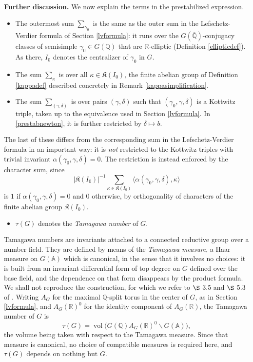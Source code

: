 \documentclass[11pt,a4paper]{article}
\theoremstyle{definition}
\theoremstyle{plain}
\theoremstyle{remark}
\theoremstyle{plain}
\DeclareMathOperator{\vol}{vol}
\begin{document}
\textbf{Further discussion.}
We now explain the terms in the prestabilized expression.

\begin{itemize}
    \item The outermost sum $\sum_{\gamma_0}$ is the same as the outer sum in the Lefschetz-Verdier formula of Section \ref{lvformula}: it runs over the $G(\overline{\mathbb{Q}})$-conjugacy classes of semisimple $\gamma_0 \in G(\mathbb{Q})$ that are $\mathbb{R}$-elliptic (Definition \ref{ellipticdef}). As there, $I_0$ denotes the centralizer of $\gamma_0$ in $G$.
    \item The sum $\sum_{\kappa}$ is over all $\kappa \in \mathfrak{K}(I_0)$, the finite abelian group of Definition \ref{kappadef} described concretely in Remark \ref{kappasimplification}.
    \item The sum $\sum_{(\gamma, \delta)}$ is over pairs $(\gamma, \delta)$ such that $(\gamma_0, \gamma, \delta)$ is a Kottwitz triple, taken up to the equivalence used in Section \ref{lvformula}. In \eqref{prestabnewton}, it is further restricted by $\delta \mapsto b$.
\end{itemize}

The last of these differs from the corresponding sum in the Lefschetz-Verdier formula in an important way: it is \emph{not} restricted to the Kottwitz triples with trivial invariant $\alpha(\gamma_0, \gamma, \delta) = 0$. The restriction is instead enforced by the character sum, since
$$\lvert \mathfrak{K}(I_0) \rvert^{-1} \sum_{\kappa \in \mathfrak{K}(I_0)} \langle \alpha(\gamma_0, \gamma, \delta), \kappa \rangle$$
is $1$ if $\alpha(\gamma_0, \gamma, \delta) = 0$ and $0$ otherwise, by orthogonality of characters of the finite abelian group $\mathfrak{K}(I_0)$.

\begin{itemize}
    \item $\tau(G)$ denotes the \textit{Tamagawa number} of $G$.
\end{itemize}

Tamagawa numbers are invariants attached to a connected reductive group over a number field. They are defined by means of the \textit{Tamagawa measure}, a Haar measure on $G(\mathbb{A})$ which is canonical, in the sense that it involves no choices: it is built from an invariant differential form of top degree on $G$ defined over the base field, and the dependence on that form disappears by the product formula. We shall not reproduce the construction, for which we refer to $\S$ 3.5 and $\S$ 5.3 of \cite{MR4615820}. Writing $A_G$ for the maximal $\mathbb{Q}$-split torus in the center of $G$, as in Section \ref{lvformula}, and $A_G(\mathbb{R})^0$ for the identity component of $A_G(\mathbb{R})$, the Tamagawa number of $G$ is
$$\tau(G) = \vol \bigl(G(\mathbb{Q})A_G(\mathbb{R})^0 \backslash G(\mathbb{A})\bigr),$$
the volume being taken with respect to the Tamagawa measure. Since that measure is canonical, no choice of compatible measures is required here, and $\tau(G)$ depends on nothing but $G$.
\end{document}
